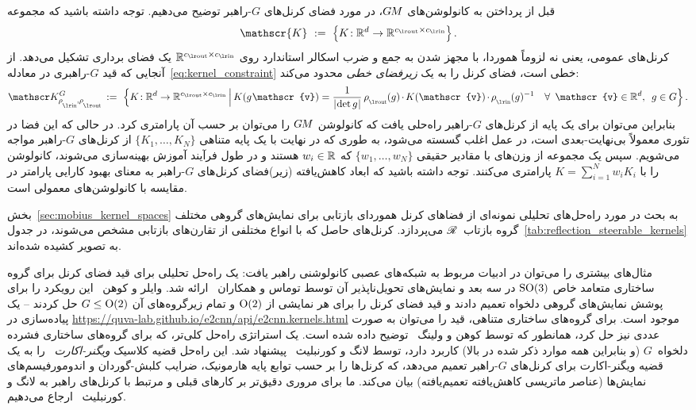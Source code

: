 قبل از پرداختن به کانولوشن‌های $G\mkern-1.4muM$، در مورد فضای کرنل‌های $G$-راهبر توضیح می‌دهیم.
توجه داشته باشید که مجموعه
\begin{align}\label{eq:unconstrained_kernel_space}
	\mathscr{K}\ :=\ \pig\{ K\!: \R^d \to \R^{\cout\times\cin} \pig\} \,.
\end{align}
کرنل‌های عمومی، یعنی نه لزوماً هموردا، با مجهز شدن به جمع و ضرب اسکالر استاندارد روی $\R^{\cout\times\cin}$ یک فضای برداری تشکیل می‌دهد.
از آنجایی که قید $G$-راهبری در معادله~\eqref{eq:kernel_constraint} خطی است، فضای کرنل را به یک \emph{زیرفضای خطی} محدود می‌کند:
\begin{align}\label{eq:G-steerable_kernel_space}
	\KG\, :=\ \Big\{ K\!: \R^d \to \R^{\cout\times\cin} \,\Big|\,
	K(g\mkern1mu \mathscr{v}) = \frac{1}{\detg}\, \rhoout(g) \mkern-1.5mu\cdot\mkern-1.5mu K(\mathscr{v}) \mkern-1.5mu\cdot\mkern-1.5mu \rhoin(g)^{-1} \ \ \ \forall\,\ \mathscr{v}\in \R^d,\,\ g\in G \Big\} \,.
\end{align}
بنابراین می‌توان برای یک پایه از کرنل‌های $G$-راهبر راه‌حلی یافت که کانولوشن $G\mkern-1.4muM$ را می‌توان بر حسب آن پارامتری کرد.
در حالی که این فضا در تئوری معمولاً بی‌نهایت-بعدی است، در عمل اغلب گسسته می‌شود، به طوری که در نهایت با یک پایه متناهی $\{K_1,\dots,K_N\}$ از کرنل‌های $G$-راهبر مواجه می‌شویم.
سپس یک مجموعه از وزن‌های با مقادیر حقیقی $\{w_1,\dots,w_N\}$ که $w_i\in\mathbb{R}$ هستند و در طول فرآیند آموزش بهینه‌سازی می‌شوند، کانولوشن را با $K = \sum_{i=1}^N w_i K_i$ پارامتری می‌کنند.
توجه داشته باشید که ابعاد کاهش‌یافته (زیر)فضای کرنل‌های $G$-راهبر به معنای بهبود کارایی پارامتر در مقایسه با کانولوشن‌های معمولی است.

بخش~\ref{sec:mobius_kernel_spaces} به بحث در مورد راه‌حل‌های تحلیلی نمونه‌ای از فضاهای کرنل هموردای بازتابی برای نمایش‌های گروهی مختلف گروه بازتاب~$\mathscr{R}$ می‌پردازد.
کرنل‌های حاصل که با انواع مختلفی از تقارن‌های بازتابی مشخص می‌شوند، در جدول~\ref{tab:reflection_steerable_kernels} به تصویر کشیده شده‌اند.

مثال‌های بیشتری را می‌توان در ادبیات مربوط به شبکه‌های عصبی کانولوشنی راهبر یافت:
یک راه‌حل تحلیلی برای قید فضای کرنل برای گروه ساختاری متعامد خاص $\operatorname{SO}(3)$ در سه بعد و نمایش‌های تحویل‌ناپذیر آن توسط توماس و همکاران~\cite{3d_steerableCNNs} ارائه شد.
وایلر و کوهن~\cite{Weiler2019_E2CNN} این رویکرد را برای پوشش نمایش‌های گروهی دلخواه تعمیم دادند و قید فضای کرنل را برای هر نمایشی از $\operatorname{O}(2)$ و تمام زیرگروه‌های آن $G\leq\operatorname{O}(2)$ حل کردند
-- یک پیاده‌سازی در \url{https://quva-lab.github.io/e2cnn/api/e2cnn.kernels.html} موجود است.
برای گروه‌های ساختاری متناهی، قید را می‌توان به صورت عددی نیز حل کرد، همانطور که توسط کوهن و ولینگ~\cite{Cohen2017-STEER} توضیح داده شده است.
یک استراتژی راه‌حل کلی‌تر، که برای گروه‌های ساختاری فشرده دلخواه~$G$ (و بنابراین همه موارد ذکر شده در بالا) کاربرد دارد، توسط لانگ و کورنبلیث~\cite{lang2020WignerEckart} پیشنهاد شد.
این راه‌حل قضیه کلاسیک \emph{ویگنر-اکارت}~\cite{agrawalla1980WignerEckart,jeevanjee2011reprOp,wigner1931gruppentheorie,wigner1993matrices} را به یک قضیه ویگنر-اکارت برای کرنل‌های $G$-راهبر تعمیم می‌دهد، که کرنل‌ها را بر حسب توابع پایه هارمونیک، ضرایب کلبش-گوردان و اندومورفیسم‌های نمایش‌ها (عناصر ماتریسی کاهش‌یافته تعمیم‌یافته) بیان می‌کند.
ما برای مروری دقیق‌تر بر کارهای قبلی و مرتبط با کرنل‌های راهبر به لانگ و کورنبلیث~\cite{lang2020WignerEckart} ارجاع می‌دهیم.

